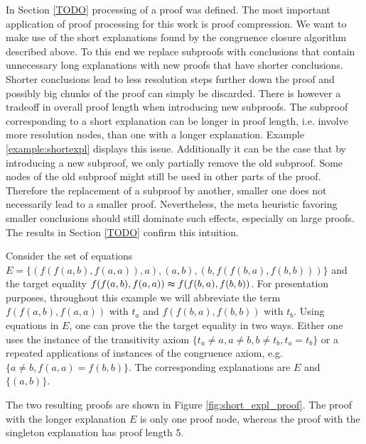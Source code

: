 \begin{example}
In Section \ref{TODO} processing of a proof was defined.
The most important application of proof processing for this work is proof compression.
We want to make use of the short explanations found by the congruence closure algorithm described above.
To this end we replace subproofs with conclusions that contain unnecessary long explanations with new proofs that have shorter conclusions.
Shorter conclusions lead to less resolution steps further down the proof and possibly big chunks of the proof can simply be discarded.
There is however a tradeoff in overall proof length when introducing new subproofs.
The subproof corresponding to a short explanation can be longer in proof length, i.e. involve more resolution nodes, than one with a longer explanation.
Example \ref{example:shortexpl} displays this issue.
Additionally it can be the case that by introducing a new subproof, we only partially remove the old subproof.
Some nodes of the old subproof might still be used in other parts of the proof.
Therefore the replacement of a subproof by another, smaller one does not necessarily lead to a smaller proof.
Nevertheless, the meta heuristic favoring smaller conclusions should still dominate such effects, especially on large proofs.
The results in Section \ref{TODO} confirm this intuition.

\begin{example}
\label{example:shortexpl}
Consider the set of equations $E = \{(f(f(a,b),f(a,a)),a),(a,b),(b,f(f(b,a),f(b,b)))\}$ and the target equality $f(f(a,b),f(a,a)) \thickapprox f(f(b,a),f(b,b))$.
For presentation purposes, throughout this example we will abbreviate the term $f(f(a,b),f(a,a))$ with $t_a$ and $f(f(b,a),f(b,b))$ with $t_b$.
Using equations in $E$, one can prove the the target equality in two ways.
Either one uses the instance of the transitivity axiom $\{t_a \neq a, a \neq b, b \neq t_b, t_a = t_b\}$ or a repeated applications of instances of the congruence axiom, e.g. $\{a \neq b, f(a,a) = f(b,b)\}$.
The corresponding explanations are $E$ and $\{(a,b)\}$.

The two resulting proofs are shown in Figure \ref{fig:short_expl_proof}.
The proof with the longer explanation $E$ is only one proof node, whereas the proof with the singleton explanation has proof length 5.

%
%
%


\end{example}
\end{example}
